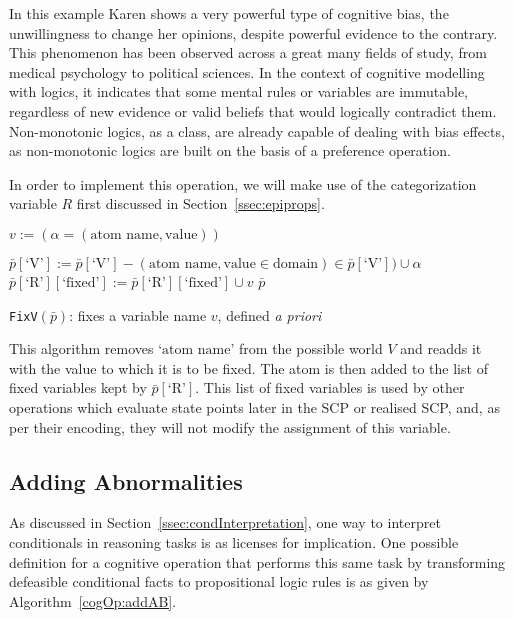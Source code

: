 In this example Karen shows a very powerful type of cognitive bias, the unwillingness to change her opinions, despite powerful evidence to the contrary. This phenomenon has been observed across a great many fields of study, from medical psychology\citep{brown2010omission}\citep{wroe2005feeling} to political sciences\citep{tappin2017heart}. In the context of cognitive modelling with logics, it indicates that some mental rules or variables are immutable, regardless of new evidence or valid beliefs that would logically contradict them. Non-monotonic logics, as a class, are already capable of dealing with bias effects, as non-monotonic logics are built on the basis of a preference operation.

In order to implement this operation, we will make use of the categorization variable $R$ first discussed in Section~\ref{ssec:epiprops}.

\begin{algorithm}[H]
\SetAlgoLined
{}
$v:= (\alpha = (\text{atom name}, \text{value}))$\;

{
$\bar{p}[\textrm{`V'}]:=\bar{p}[\textrm{`V'}] - (\text{atom name}, \text{value} \in \text{domain}) \in \bar{p}[\textrm{`V'}]) \cup \alpha$\;
$\bar{p}[\textrm{`R'}][\text{`fixed'}]:= \bar{p}[\textrm{`R'}][\text{`fixed'}] \cup v$\;
\Return $\bar{p}$
}

\caption{\texttt{FixV}$(\bar{p})$: fixes a variable name $v$, defined \textit{a priori}}
 \label{cogOp:fixV}
\end{algorithm}


This algorithm removes `$\text{atom name}$' from the possible world $V$ and readds it with the value to which it is to be fixed. The atom is then added to the list of fixed variables kept by $\bar{p}[\textrm{`R'}]$. This list of fixed variables is used by other operations which evaluate state points later in the SCP or realised SCP, and, as per their encoding, they will not modify the assignment of this variable.

\subsection{Adding Abnormalities}

As discussed in Section~\ref{ssec:condInterpretation}, one way to interpret conditionals in reasoning tasks is as licenses for implication. One possible definition for a cognitive operation that performs this same task by transforming defeasible conditional facts to propositional logic rules is as given by Algorithm~\ref{cogOp:addAB}.

